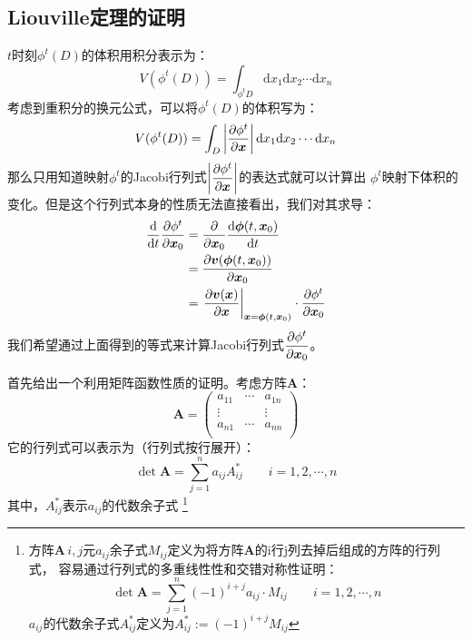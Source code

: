     \subsection{Liouville定理的证明}
    $t$时刻$\phi^t(D)$的体积用积分表示为：
    \begin{equation}
        V(\phi^t(D)) = \int_{\phi^t D}\mathrm{d} x_1\mathrm{d} x_2\cdots\mathrm{d} x_n
    \end{equation}
    考虑到重积分的换元公式，可以将$\phi^t(D)$的体积写为：
    \begin{equation}
        V(\phi^t(D)) = \int_{D}\left|\frac{\partial{\phi^t}}{\partial{\bm{x}}}\right|\mathrm{d} x_1\mathrm{d} x_2\cdots\mathrm{d} x_n
    \end{equation}
    那么只用知道映射$\phi^t$的Jacobi行列式$\displaystyle\left|\frac{\partial{\phi^t}}{\partial{\bm{x}}}\right|$的表达式就可以计算出
    $\phi^t$映射下体积的变化。但是这个行列式本身的性质无法直接看出，我们对其求导：
    \begin{equation}
        \begin{split}
            \frac{\mathrm{d}{}}{\mathrm{d}{t}}\frac{\partial{\phi^t}}{\partial{\bm{x}_0}} &= \frac{\partial{}}{\partial{\bm{x}_0}}\frac{\mathrm{d}{\bm{\phi}(t, \bm{x}_0)}}{\mathrm{d}{t}}\\
            & = \frac{\partial{\bm{v}(\bm{\phi}(t, \bm{x}_0))}}{\partial{\bm{x}_0}}\\
            & = \left.\frac{\partial{\bm{v}(\bm{x})}}{\partial{\bm{x}}}\right|_{\bm{x}=\bm{\phi}(t, \bm{x}_0)}\cdot
            \frac{\partial{\phi^t}}{\partial{\bm{x}_0}}
        \end{split}
    \end{equation}
    我们希望通过上面得到的等式来计算Jacobi行列式$\displaystyle\frac{\partial{\phi^t}}{\partial{\bm{x}_0}}$。
    \par 
    首先给出一个利用矩阵函数性质的证明。考虑方阵$\bm{A}$：
    \begin{equation}
        \bm{A} = 
        \begin{pmatrix}
            a_{11} & \cdots & a_{1n}\\
            \vdots & & \vdots\\
            a_{n1} & \cdots & a_{nn}\\
        \end{pmatrix}
    \end{equation}
    它的行列式可以表示为（行列式按行展开）：
    \begin{equation}
        \det{\bm{A}} = \sum_{j=1}^na_{ij} A_{ij}^* \quad\quad i = 1, 2, \cdots, n
    \end{equation}
    其中，$A_{ij}^*$表示$a_{ij}$的代数余子式
    \footnote{方阵$\bm{A}\,$$i,j$元$a_{ij}$余子式$M_{ij}$定义为将方阵$\bm{A}$的i行j列去掉后组成的方阵的行列式，
    容易通过行列式的多重线性性和交错对称性证明：
    \begin{equation}
        \det \bm{A} = \sum_{j = 1}^{n}(-1)^{i + j}a_{ij}\cdot M_{ij}\quad \quad i = 1, 2, \cdots, n
    \end{equation}
    $a_{ij}$的代数余子式$A_{ij}^*$定义为$A_{ij}^* := (-1)^{i+j}M_{ij}$
    }

